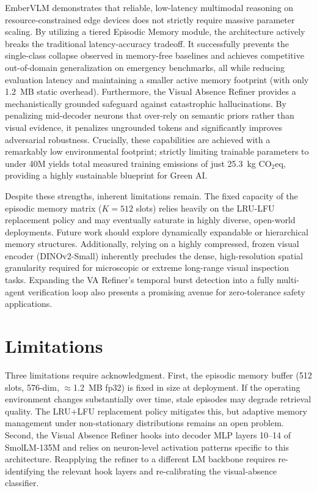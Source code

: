 \documentclass[runningheads]{llncs}
\begin{document}
EmberVLM demonstrates that reliable, low-latency multimodal reasoning on resource-constrained edge devices does not strictly require massive parameter scaling. By utilizing a tiered Episodic Memory module, the architecture actively breaks the traditional latency-accuracy tradeoff. It successfully prevents the single-class collapse observed in memory-free baselines and achieves competitive out-of-domain generalization on emergency benchmarks, all while reducing evaluation latency and maintaining a  smaller active memory footprint (with only 1.2~MB static overhead). Furthermore, the Visual Absence Refiner provides a mechanistically grounded safeguard against catastrophic hallucinations. By penalizing mid-decoder neurons that over-rely on semantic priors rather than visual evidence, it penalizes ungrounded tokens and significantly improves adversarial robustness. Crucially, these capabilities are achieved with a remarkably low environmental footprint; strictly limiting trainable parameters to under 40M yields total measured training emissions of just 25.3~kg CO$_2$eq, providing a highly sustainable blueprint for Green AI.

Despite these strengths, inherent limitations remain. The fixed capacity of the episodic memory matrix ($K=512$ slots) relies heavily on the LRU-LFU replacement policy and may eventually saturate in highly diverse, open-world deployments. Future work should explore dynamically expandable or hierarchical memory structures. Additionally, relying on a highly compressed, frozen visual encoder (DINOv2-Small) inherently precludes the dense, high-resolution spatial granularity required for microscopic or extreme long-range visual inspection tasks. Expanding the VA Refiner's temporal burst detection into a fully multi-agent verification loop also presents a promising avenue for zero-tolerance safety applications.

\section{Limitations}

Three limitations require acknowledgment. First, the episodic
memory buffer (512 slots, 576-dim, $\approx$1.2~MB fp32) is
fixed in size at deployment. If the operating environment changes
substantially over time, stale episodes may degrade retrieval
quality. The LRU+LFU replacement policy mitigates this, but
adaptive memory management under non-stationary distributions
remains an open problem. Second, the Visual Absence Refiner hooks
into decoder MLP layers 10--14 of SmolLM-135M and relies on
neuron-level activation patterns specific to this architecture.
Reapplying the refiner to a different LM backbone requires
re-identifying the relevant hook layers and re-calibrating the
visual-absence classifier.
\end{document}
